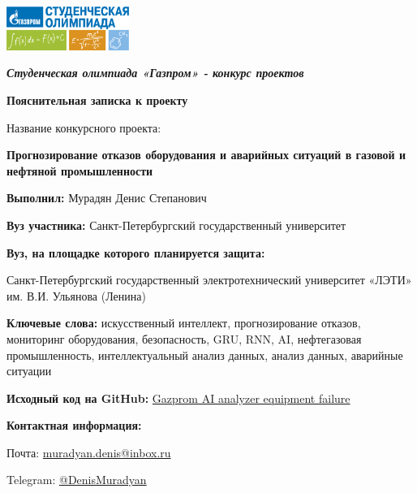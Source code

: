 \documentclass[a4paper,12pt]{article}
\begin{document}
\begin{titlepage}
    \begin{center}
        \includegraphics[width=0.3\textwidth]{../../Include/logo.png}\\[1cm]

        {\itshape\Large\bfseries Студенческая олимпиада «Газпром» - конкурс проектов\par}
        \vspace{0.5cm}

        {\Large\bfseries Пояснительная записка к проекту\par}
        \vspace{2cm}

        {\large Название конкурсного проекта: \par}
        \vspace{0.3cm}

        {\LARGE\bfseries Прогнозирование отказов оборудования и аварийных ситуаций в газовой и нефтяной промышленности\par}
        \vspace{0.5cm}

    \end{center}

    \begin{flushleft}
        {\normalsize
        \textbf{Выполнил:} Мурадян Денис Степанович\par
        \vspace{0.3cm}
        \textbf{Вуз участника:} Санкт-Петербургский государственный университет\par
        \vspace{0.3cm}
        \textbf{Вуз, на площадке которого планируется защита:} \par
        Санкт-Петербургский государственный электротехнический университет «ЛЭТИ» им. В.И. Ульянова (Ленина)\par
        \vspace{0.3cm}
        \textbf{Ключевые слова:} искусственный интеллект, прогнозирование отказов, мониторинг оборудования, безопасность,
            GRU, RNN, AI, нефтегазовая промышленность, интеллектуальный анализ данных, анализ данных, аварийные ситуации\par
        \textbf{Исходный код на GitHub:}  \href{https://github.com/Denigmma/Gazprom_AI_analyzer_equipment_failure}{Gazprom AI analyzer equipment failure}\par
        \textbf{Контактная информация:}\par
        \quad Почта: \href{mailto:muradyan.denis@inbox.ru}{muradyan.denis@inbox.ru}\par
        \quad Telegram: \href{https://t.me/DenisMuradyan}{@DenisMuradyan}\par
        }
    \end{flushleft}


\end{titlepage}
\end{document}
